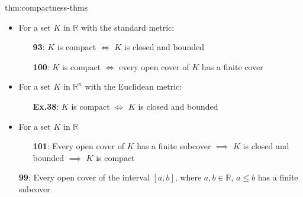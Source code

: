 \documentclass[landscape, 8pt]{extarticle}
\begin{document}
\begin{multicols}{3}
\vspace{-6pt}
\begin{thm}{thm:compactness-thms}{}
    \vspace{-5pt}
    \vspace{-7pt}
    \begin{itemize}[leftmargin=1.5em]
        \item For a set $K$ in $\mathbb{R}$ with the standard metric:
            \vspace{-5pt}
            \begin{itemize}
                \item[\textbf{93}:] $K$ is compact $\iff$ $K$ is closed and bounded
                \item[\textbf{100}:] $K$ is compact $\iff$ every open cover of $K$ has a finite cover
            \end{itemize}


        \vspace{-5pt}
        \item For a set $K$ in $\mathbb{R}^{n}$ with the Euclidean metric:
            \vspace{-5pt}
            \begin{itemize}
                \item[\textbf{Ex.38}:] $K$ is compact $\iff$ $K$ is closed and bounded
            \end{itemize}

        \vspace{-5pt}
        \item For a set $K$ in $\mathbb{R}$
            \vspace{-5pt}
            \begin{itemize}
                \item[\textbf{101}:] Every open cover of $K$ has a finite subcover $\implies$ $K$ is closed and bounded $\implies$ $K$ is compact
            \end{itemize} 

        \vspace{-5pt}
    \item[\textbf{99}:] Every open cover of the interval $[a, b]$, where $a, b\in \mathbb{R}$, $a \le b$ has a finite subcover

    
    \end{itemize}


\end{thm}
\end{multicols}
\end{document}
